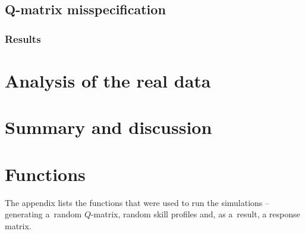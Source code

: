 \documentclass[english]{pwr_wmat_praca_dyplomowa}
\theoremstyle{plain}
\theoremstyle{definition}
\numberwithin{theorem}{chapter}
\begin{document}
\section{Q-matrix misspecification}\label{section:qmat_misspec}

\subsection{Results}

\chapter{Analysis of the real data}\label{chapter:real_data}

{\backmatter \chapter{Summary and discussion}}

\appendix
{\chapter{Functions}}\label{appendix}

\noindent The appendix lists the functions that were used to run the simulations -- generating a~random $Q$-matrix, random skill profiles and, as a~result, a response matrix. \vspace{5pt}
\end{document}

